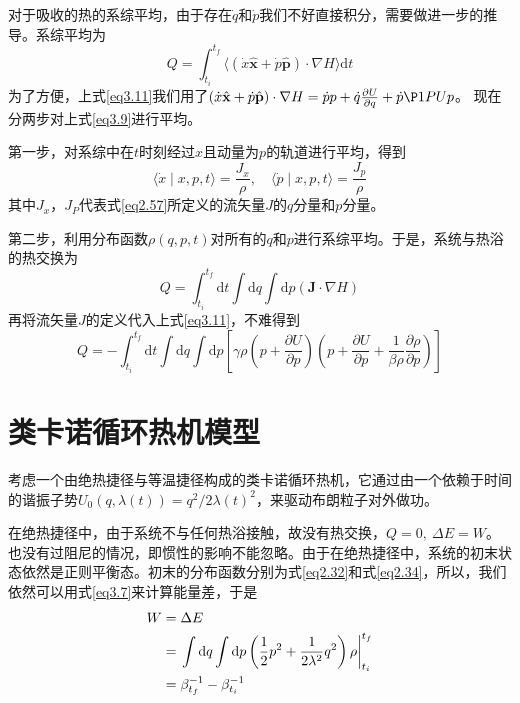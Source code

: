 对于吸收的热的系综平均，由于存在$\dot{q}$和$\dot{p}$我们不好直接积分，需要做进一步的推导。系综平均为
\begin{equation}
    Q=\int_{t_i}^{t_f}\langle(\dot{x} \hat{\mathbf{x}}+\dot{p} \hat{\mathbf{p}}) \cdot \nabla H\rangle \mathrm{d} t
    \label{eq3.9}
\end{equation}
为了方便，上式\eqref{eq3.11}我们用了$(\dot{x} \hat{\mathbf{x}}+\dot{p} \hat{\mathbf{p}}) \cdot \nabla H  = \dot{p} p+\dot{q} \frac{\partial U}{\partial q} +  \dot{p} \P1P{U}{p}$。
现在分两步对上式\eqref{eq3.9}进行平均。

第一步，对系综中在$t$时刻经过$x$且动量为$p$的轨道进行平均，得到
\begin{equation}
    \langle\dot{x} \mid x, p, t\rangle=\frac{J_{x}}{\rho}, \quad\langle\dot{p} \mid x, p, t\rangle=\frac{J_{p}}{\rho}
    \label{eq3.10}
\end{equation}
其中$J_x$，$J_P$代表式\eqref{eq2.57}所定义的流矢量$J$的$q$分量和$p$分量。

第二步，利用分布函数$\rho(q,p,t)$对所有的$q$和$p$进行系综平均。于是，系统与热浴的热交换为
\begin{equation}
    Q=\int_{t_i}^{t_f} \mathrm{d} t \int \mathrm{d} q \int \mathrm{d} p(\bm{J} \cdot \nabla H)
    \label{eq3.11}
\end{equation}
再将流矢量$J$的定义代入上式\eqref{eq3.11}，不难得到
\begin{equation}
    Q=-\int_{t_i}^{t_f} \mathrm{d} t \int \mathrm{d} q \int \mathrm{d} p\left[\gamma \rho\left(p+\frac{\partial U}{\partial p}\right)\left(p+\frac{\partial U}{\partial p}+\frac{1}{\beta \rho} \frac{\partial \rho}{\partial p}\right)\right]
    \label{eq3.12}
\end{equation}

\section{类卡诺循环热机模型}
\qquad 考虑一个由绝热捷径与等温捷径构成的类卡诺循环热机，它通过由一个依赖于时间的谐振子势$U_{0}(q, \lambda(t))= q^{2}/2{\lambda(t)}^2 $，来驱动布朗粒子对外做功。

在绝热捷径中，由于系统不与任何热浴接触，故没有热交换，$Q=0,\ \Delta E = W$。也没有过阻尼的情况，即惯性的影响不能忽略。由于在绝热捷径中，系统的初末状态依然是正则平衡态。初末的分布函数分别为式\eqref{eq2.32}和式\eqref{eq2.34}，所以，我们依然可以用式\eqref{eq3.7}来计算能量差，于是
\begin{equation}
    \begin{split}
        W &= \Delta E\\
        &= \left.\int \mathrm{d} q \int \mathrm{d} p \left(\frac{1}{2} p^2 + \frac{1}{2 \lambda^2} q^2 \right) \rho \right|_{t_{i}} ^{t_{f}}\\
        &=\beta_{t_f}^{-1}-\beta_{t_i}^{-1}
    \end{split}
    \label{eq3.15.5}
\end{equation}

